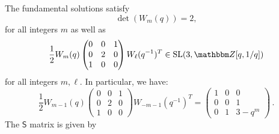 \documentclass[12pt,reqno]{amsart}
\theoremstyle{definition}
\def\BZ{\mathbbm Z}
\def\SL{\mathrm{SL}}
\begin{document}
The fundamental solutions satisfy
\begin{equation}
  \label{det52}
  \det(W_m(q))=2,
\end{equation}
for all integers $m$ as well as
\begin{equation}
  \label{WWT52}
  \frac{1}{2} W_m(q)
  \begin{pmatrix} 0&0&1 \\ 0&2&0 \\ 1&0&0 \end{pmatrix}
  W_{\ell}(q^{-1})^T \in \SL(3,\BZ[q,1/q]) 
\end{equation}
for all integers $m, \ell$. In particular, we have:
\begin{equation}
  \label{WWT52b}
  \frac{1}{2} W_{m-1}(q)
  \begin{pmatrix} 0&0&1 \\ 0&2&0 \\ 1&0&0 \end{pmatrix}
  W_{-m-1}(q^{-1})^T =
  \begin{pmatrix} 1&0&0 \\ 0&0&1 \\ 0&1&3-q^{m} \end{pmatrix} \,.
\end{equation}
The $\mathsf{S}$ matrix is given by 
\end{document}
